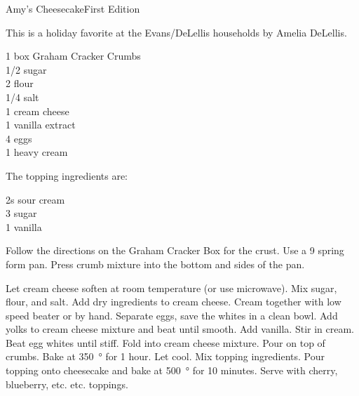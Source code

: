 \begin{entry}{Amy's Cheesecake}{First Edition}

\begin{open}
  This is a holiday favorite at the Evans/DeLellis households by Amelia
  DeLellis.
\end{open}
\begin{ingredients}
  1 box Graham Cracker Crumbs \\
  \SI{1/2}{\cup} sugar \\
  \SI{2}{\tblspoon}  flour \\
  \SI{1/4}{\teaspoon}  salt \\
  \SI{1}{\pound} cream cheese \\
  \SI{1}{\teaspoon}  vanilla extract \\
  4 eggs \\
  \SI{1}{\cup} heavy cream
\end{ingredients}
The topping ingredients are:
\begin{ingredients}
  \SI{2}{\cup}s sour cream \\
  \SI{3}{\tblspoon}  sugar \\
  \SI{1}{\teaspoon} vanilla
\end{ingredients}
Follow the directions on the Graham Cracker Box for the crust.  Use a
\SI{9}{\inch} spring form pan.  Press crumb mixture into the bottom and sides
of the pan.

Let cream cheese soften at room temperature (or use microwave).  Mix sugar,
flour, and salt.  Add dry ingredients to cream cheese.  Cream together with
low speed beater or by hand.  Separate eggs, save the whites in a clean bowl.
Add yolks to cream cheese mixture and beat until smooth.  Add vanilla.  Stir
in cream.  Beat egg whites until stiff.  Fold into cream cheese mixture.  Pour
on top of crumbs.  Bake at \SI{350}{\degree} for 1 hour.  Let cool.  Mix
topping ingredients.  Pour topping onto cheesecake and bake at
\SI{500}{\degree} for 10 minutes.  Serve with cherry, blueberry,
etc. etc. toppings.
\end{entry}

